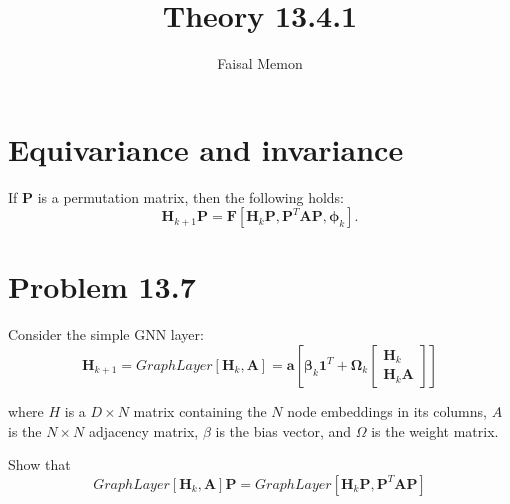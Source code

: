 \documentclass{article}
\title{Theory 13.4.1}
\author{Faisal Memon}
\begin{document}
\maketitle

\section{Equivariance and invariance}

If $\mathbf{P}$ is a permutation matrix, then the following holds:
\begin{equation*}
    \mathbf{H}_{k+1}\mathbf{P} = \mathbf{F}[\mathbf{H}_{k}\mathbf{P}, \mathbf{P}^{T}\mathbf{A}\mathbf{\mathbf{P}}, \boldsymbol{\phi}_{k}].
\end{equation*}

\section{Problem 13.7}
Consider the simple GNN layer:
\begin{equation*}
    \mathbf{H}_{k+1} = GraphLayer[\mathbf{H}_{k}, \mathbf{A}]
        = \mathbf{a}[\boldsymbol{\beta}_{k}\mathbf{1}^{T} + \boldsymbol{\Omega}_{k}\begin{bmatrix}
            \mathbf{H}_{k}\\
            \mathbf{H}_{k}\mathbf{A}
            \end{bmatrix}]
\end{equation*}

where \(H\) is a \(D \times N\) matrix containing the \(N\) node embeddings in its columns,
 \(A\) is the \(N \times N\) adjacency matrix, \(\beta\) is the bias vector, and \(\Omega\) is the weight matrix.

Show that 
\begin{equation*}
    GraphLayer[\mathbf{H}_{k}, \mathbf{A}]\mathbf{P} = GraphLayer[\mathbf{H}_{k}\mathbf{P}, \mathbf{P}^{T}\mathbf{A}\mathbf{\mathbf{P}}]
\end{equation*}
\end{document}
